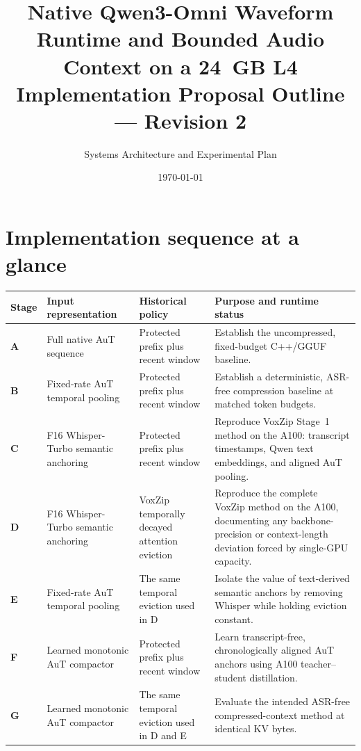 \documentclass[10pt,letterpaper]{article}
\title{\textbf{Native Qwen3-Omni Waveform Runtime and Bounded Audio Context on a 24~GB L4}\\
\large Implementation Proposal Outline --- Revision 2}
\author{Systems Architecture and Experimental Plan}
\date{\today}
\begin{document}
\maketitle

\section*{Implementation sequence at a glance}

\begin{table}[h]
\centering
\small
\setlength{\tabcolsep}{4pt}
\renewcommand{\arraystretch}{1.18}
\begin{tabularx}{\textwidth}{@{}>{\bfseries}p{0.42in}p{2.35in}p{1.75in}X@{}}
\toprule
Stage & Input representation & Historical policy & Purpose and runtime status \\
\midrule
A & Full native AuT sequence & Protected prefix plus recent window & Establish the uncompressed, fixed-budget C++/GGUF baseline. \\
B & Fixed-rate AuT temporal pooling & Protected prefix plus recent window & Establish a deterministic, ASR-free compression baseline at matched token budgets. \\
C & F16 Whisper-Turbo semantic anchoring & Protected prefix plus recent window & Reproduce VoxZip Stage~1 method on the A100: transcript timestamps, Qwen text embeddings, and aligned AuT pooling. \\
D & F16 Whisper-Turbo semantic anchoring & VoxZip temporally decayed attention eviction & Reproduce the complete VoxZip method on the A100, documenting any backbone-precision or context-length deviation forced by single-GPU capacity. \\
E & Fixed-rate AuT temporal pooling & The same temporal eviction used in D & Isolate the value of text-derived semantic anchors by removing Whisper while holding eviction constant. \\
F & Learned monotonic AuT compactor & Protected prefix plus recent window & Learn transcript-free, chronologically aligned AuT anchors using A100 teacher--student distillation. \\
G & Learned monotonic AuT compactor & The same temporal eviction used in D and E & Evaluate the intended ASR-free compressed-context method at identical KV bytes. \\
\bottomrule
\end{tabularx}
\end{table}
\end{document}
